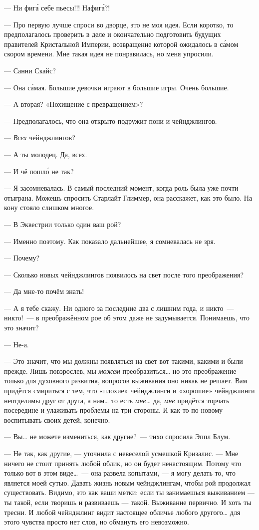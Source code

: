 \documentclass[fontsize=11pt,a5paper,titlepage=firstcover]{scrbook}
\begin{document}
--- Ни фига́ себе пьесы!!! Нафига́?!

--- Про первую лучше спроси во дворце, это не моя идея. Если коротко, то предполагалось проверить в деле и окончательно подготовить будущих правителей Кристальной Империи, возвращение которой ожидалось в са́мом скором времени. Мне такая идея не понравилась, но меня упросили.

--- Санни Скайс?

--- Она са́мая. Большие девочки играют в большие игры. Очень большие.

--- А вторая? «Похищение с превращением»?

--- Предполагалось, что она открыто подружит пони и чейнджлингов.

--- \emph{Всех} чейнджлингов?

--- А ты молодец. Да, всех.

--- И чё пошло́ не так?

--- Я засомневалась. В самый последний момент, когда роль была уже почти отыграна. Можешь спросить Старлайт Глиммер, она расскажет, как это было. На кону стояло слишком многое.

--- В Эквестрии только один ваш рой?

--- Именно поэтому. Как показало дальнейшее, я сомневалась не зря.

--- Почему?

--- Сколько новых чейнджлингов появилось на свет после того преображения?

--- Да мне-то почём знать!

--- А я тебе скажу. Ни одного за последние два с лишним года, и никто~--- никто!~--- в преображённом рое об этом даже не задумывается. Понимаешь, что это значит?

--- Не-а.

--- Это значит, что мы должны появляться на свет вот такими, какими и были прежде. Лишь повзрослев, мы \emph{можем} преобразиться{\ldots} но это преображение только для духовного развития, вопросов выживания оно никак не решает. Вам придётся смириться с тем, что «плохие» чейнджлинги и «хорошие» чейнджлинги неотделимы друг от друга, а нам{\ldots} то есть \emph{мне}{\ldots} да, \emph{мне} придётся торчать посередине и улаживать проблемы на три стороны. И как-то по-новому воспитывать своих детей, конечно.

--- Вы{\ldots} не можете измениться, как другие?~--- тихо спросила Эппл Блум.

--- Не так, как другие, --- уточнила с невеселой усмешкой Кризалис. --- Мне ничего не стоит принять любой облик, но он будет ненастоящим. Потому что только вот в этом виде{\ldots}~--- она развела копытами, --- я могу делать то, что является моей сутью. Давать жизнь новым чейнджлингам, чтобы рой продолжал существовать. Видимо, это как ваши метки: если ты занимаешься выживанием --- ты такой, если творишь и развиваешь --- такой. Выживание первично. И хоть ты тресни. И любой чейнджлинг видит настоящее обличье любого другого{\ldots} для этого чувства просто нет слов, но обмануть его невозможно.
\end{document}
